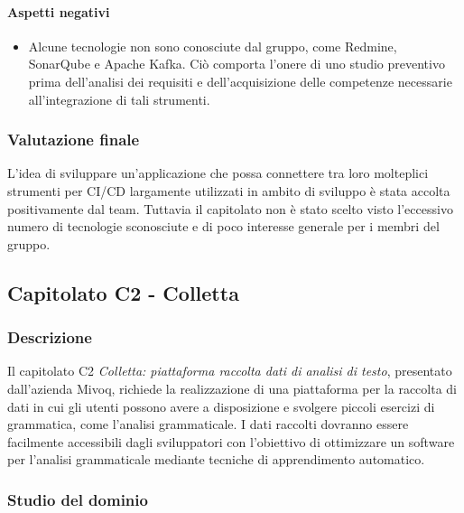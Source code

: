 {	\paragraph{Aspetti negativi}
	\begin{itemize}
		\item {Alcune tecnologie non sono conosciute dal gruppo, come Redmine, SonarQube e Apache Kafka. Ciò comporta l'onere di uno studio preventivo prima dell'analisi dei requisiti e dell'acquisizione delle competenze necessarie all'integrazione di tali strumenti.}
	\end{itemize} 
	\subsubsection{Valutazione finale}
	L'idea di sviluppare un'applicazione che possa connettere tra loro molteplici strumenti per CI/CD largamente utilizzati in ambito di sviluppo è stata accolta positivamente dal team. Tuttavia il capitolato non è stato scelto visto l'eccessivo numero di tecnologie sconosciute e di poco interesse generale per i membri del gruppo.
	
	\subsection{Capitolato C2 - Colletta}
	\subsubsection{Descrizione}
	Il capitolato C2 \emph{Colletta: piattaforma raccolta dati di analisi di testo}, presentato dall'azienda Mivoq, richiede la realizzazione di una piattaforma per la raccolta di dati in cui gli utenti possono avere a disposizione e svolgere piccoli esercizi di grammatica, come l'analisi grammaticale.
	I dati raccolti dovranno essere facilmente accessibili dagli sviluppatori con l'obiettivo di ottimizzare un software per l'analisi grammaticale mediante tecniche di apprendimento automatico.  
	
	\subsubsection{Studio del dominio}
}
